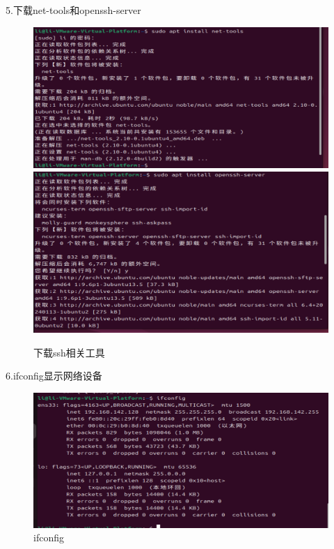 \documentclass[a4paper, 12pt]{article}
\begin{document}
5.下载net-tools和openssh-server
\begin{figure}[H]
  \centering
  \includegraphics[width=\textwidth]{屏幕截图 2024-09-12 213056.png}
  \includegraphics[width=\textwidth]{屏幕截图 2024-09-12 213734.png}
  \caption{下载ssh相关工具}
\end{figure}

6.ifconfig显示网络设备
\begin{figure}[H]
  \centering
  \includegraphics[width=\textwidth]{屏幕截图 2024-09-12 214319.png}
  \caption{ifconfig}
\end{figure}
\end{document}

